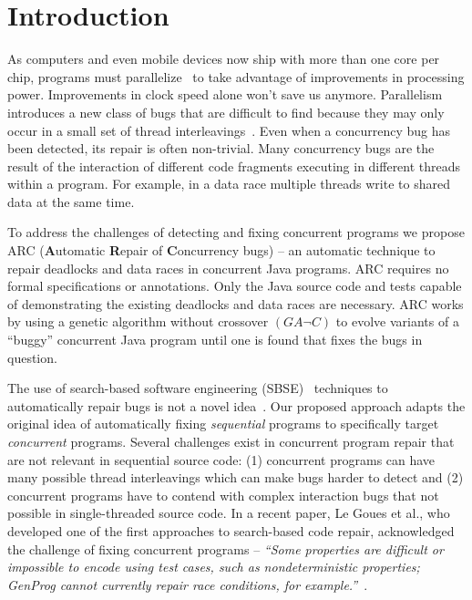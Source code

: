  \section{Introduction}
\label{sec:introduction}

As computers and even mobile devices now ship with more than one core per chip, programs must parallelize~\cite{SL05} to take advantage of improvements in processing power. Improvements in clock speed alone won't save us anymore. Parallelism introduces a new class of bugs that are difficult to find because they may only occur in a small set of thread interleavings~\cite{MQB07}. Even when a concurrency bug has been detected, its repair is often non-trivial. Many concurrency bugs are the result of the interaction of different code fragments executing in different threads within a program. For example, in a data race multiple threads write to shared data at the same time.

To address the challenges of detecting and fixing concurrent programs we propose ARC (\textbf{A}utomatic \textbf{R}epair of \textbf{C}oncurrency bugs) -- an automatic technique to repair deadlocks and data races in concurrent Java programs. ARC requires no formal specifications or annotations. Only the Java source code and tests capable of demonstrating the existing deadlocks and data races are necessary. ARC works by using a genetic algorithm without crossover $(GA \neg C)$ to evolve variants of a ``buggy'' concurrent Java program until one is found that fixes the bugs in question.

The use of search-based software engineering (SBSE)~\cite{Har+10} techniques to automatically repair bugs is not a novel idea~\cite{FNWG09, WNLF09, NWLF09, WFGN10, GNFW11, LDFW12}. Our proposed approach adapts the original idea of automatically fixing \textit{sequential} programs to specifically target \textit{concurrent} programs. Several challenges exist in concurrent program repair  that are not relevant in sequential source code: (1) concurrent programs can have many possible thread interleavings which can make bugs harder to detect and (2) concurrent programs have to contend with complex interaction bugs that not possible in single-threaded source code. In a recent paper, Le Goues et al., who developed one of the first approaches to search-based code repair, acknowledged the challenge of fixing concurrent programs -- \textit{``Some properties are difficult or impossible to encode using test cases, such as nondeterministic properties; GenProg cannot currently repair race conditions, for example.''}~\cite{GNFW11}.

